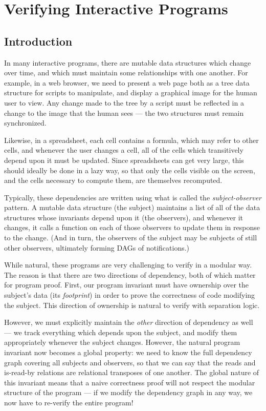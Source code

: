 \chapter{Verifying Interactive Programs}

\section{Introduction}

In many interactive programs, there are mutable data structures which
change over time, and which must maintain some relationships with one
another. For example, in a web browser, we need to present a web page
both as a tree data structure for scripts to manipulate, and display a
graphical image for the human user to view. Any change made to the
tree by a script must be reflected in a change to the image that the
human sees --- the two structures must remain synchronized.

Likewise, in a spreadsheet, each cell contains a formula, which may
refer to other cells, and whenever the user changes a cell, all of the
cells which transitively depend upon it must be updated. Since
spreadsheets can get very large, this should ideally be done in a lazy
way, so that only the cells visible on the screen, and the cells
necessary to compute them, are themselves recomputed.

Typically, these dependencies are written using what is called the
\emph{subject-observer} pattern. A mutable data structure (the
subject) maintains a list of all of the data structures whose
invariants depend upon it (the observers), and whenever it changes, it
calls a function on each of those observers to update them in response
to the change. (And in turn, the observers of the subject may be
subjects of still other observers, ultimately forming DAGs of
notifications.)

While natural, these programs are very challenging to verify in a
modular way. The reason is that there are two directions of
dependency, both of which matter for program proof. First, our program
invariant must have ownership over the subject's data (its
\emph{footprint}) in order to prove the correctness of code modifying
the subject. This direction of ownership is natural to verify with
separation logic.

However, we must explicitly maintain the \emph{other} direction of
dependency as well --- we track everything which depends upon the
subject, and modify them appropriately whenever the subject changes.
However, the natural program invariant now becomes a global property:
we need to know the full dependency graph covering all subjects and
observers, so that we can say that the reads and is-read-by relations
are relational transposes of one another. The global nature of this
invariant means that a naive correctness proof will not respect the
modular structure of the program --- if we modify the dependency graph
in any way, we now have to re-verify the entire program!

